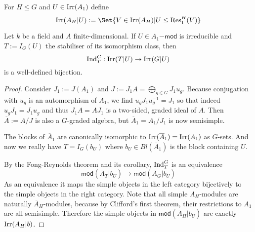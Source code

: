 \begin{definition}
For $H\leq G$ and $U\in\operatorname{Irr}(A_1)$ define
\[\Irr(A_H | U) := \Set{V\in\Irr(A_H) | U \leq \Res_1^H(V)}\]
\end{definition}

\begin{theorem}
Let $k$ be a field and $A$ finite-dimensional. If $U\in A_1\mathsf{-mod}$ is irreducible and $T:=I_G(U)$ the stabiliser of its isomorphism class, then
\[\operatorname{Ind}_T^G: \operatorname{Irr}(T | U) \to \operatorname{Irr}(G | U)\]
is a well-defined bijection.
\end{theorem}
\begin{proof}
Consider $J_1:=J(A_1)$ and $J:=J_1 A=\bigoplus_{g\in G} J_1 u_g$. Because conjugation with $u_g$ is an automorphism of $A_1$, we find $u_g J_1 u_g^{-1} = J_1$ so that indeed $u_g J_1 = J_1 u_g$ and thus $J_1 A=A J_1$ is a two-sided, graded ideal of $A$. Then $\overline{A} := A/J$ is also a $G$-graded algebra, but $\overline{A}_1=A_1/J_1$ is now semisimple.

\medbreak
The blocks of $\overline{A}_1$ are canonically isomorphic to $\operatorname{Irr}(\overline{A}_1)=\operatorname{Irr}(A_1)$ as $G$-sets. And now we really have $T=I_G(b_U)$ where $b_U\in Bl(\overline{A}_1)$ is the block containing $U$.

\medbreak
By the Fong-Reynolds theorem and its corollary, $\operatorname{Ind}_T^G$ is an equivalence
\[\mathsf{mod}(\overline{A}_T|b_U) \to \mathsf{mod}(\overline{A}_G|b_U)\]
As an equivalence it maps the simple objects in the left category bijectively to the simple objects in the right category. Note that all simple $A_H$-modules are naturally $\overline{A}_H$-modules, because by Clifford's first theorem, their restrictions to $A_1$ are all semisimple. Therefore the simple objects in $\mathsf{mod}(\overline{A}_H|b_U)$ are exactly $\operatorname{Irr}(A_H|b)$.
\end{proof}